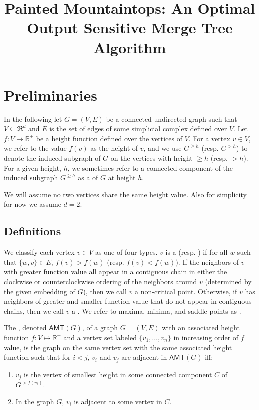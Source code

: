 \documentclass[A4paper,11pt]{article}
\author{}
\title{Painted Mountaintops: \break An Optimal Output Sensitive Merge Tree Algorithm}
\date{}
\newcommand{\RR}{\mathbb{R}}
\newcommand{\AMT}{\ensuremath{\mathsf{AMT}}\xspace}
\begin{document}
\maketitle






\section{Preliminaries}
In the following let $G=(V,E)$ be a connected undirected graph such that $V\subseteq \Re^d$ and $E$ is the set of edges of some simplicial complex defined over $V$.  Let $f:V \mapsto \RR^+$ be a height function defined over the vertices of $V$.  For a vertex $v\in V$, we refer to the value $f(v)$ as the height of $v$, and we use $G^{\geq h}$ (resp. $G^{>h}$) to denote the induced subgraph of $G$ on the vertices with height $\geq h$ (resp. $>h$).  For a given height, $h$, we sometimes refer to a connected component of the induced subgraph $G^{\geq h}$ as a  of $G$ at height $h$.

We will assume no two vertices share the same height value.  Also for simplicity for now we assume $d=2$.

\subsection{Definitions}

\begin{definition}
We classify each vertex $v\in V$ as one of four types.  $v$ is a  (resp. ) if for all $w$ such that $\{w,v\}\in E$, $f(v)>f(w)$ (resp. $f(v)<f(w)$).  If the neighbors of $v$ with greater function value all appear in a contiguous chain in either the clockwise or counterclockwise ordering of the neighbors around $v$ (determined by the given embedding of $G$), then we call $v$ a non-critical point.  Otherwise, if $v$ has neighbors of greater and smaller function value that do not appear in contiguous chains, then we call $v$ a .  We refer to maxima, minima, and saddle points as .
\end{definition}

\begin{definition}
The , denoted $\AMT(G)$, of a graph $G=(V,E)$ with an associated height function $f:V \mapsto \RR^+$ and a vertex set labeled $\{v_1,\dots,v_n\}$ in increasing order of $f$ value, is the graph on the same vertex set with the same associated height function such that for $i<j$, $v_i$ and $v_j$ are adjacent in $\AMT(G)$ iff:
\begin{enumerate}
 \item $v_j$ is the vertex of smallest height in some connected component $C$ of $G^{>f(v_i)}$.
 \item In the graph $G$, $v_i$ is adjacent to some vertex in $C$.
\end{enumerate}
\end{definition}
\end{document}
